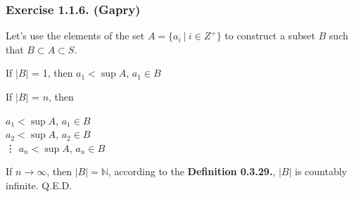 \subsubsection*{Exercise 1.1.6. (Gapry)}

\begin{flushleft}
Let's use the elements of the set $A = \{a_i\ |\ i \in Z^+\}$ to construct a subset $B$ such that $B \subset A \subset S$.
\vspace{10px}

If $|B|$ = 1, then $a_1 < \sup A$, $a_1 \in B$  
\vspace{10px}

If $|B|$ = $n$, then 

$a_1 < \sup A$, $a_1 \in B$ \\
$a_2 < \sup A$, $a_2 \in B$ \\ 
\vdots
$a_n < \sup A$, $a_n \in B$ \\ 

\vspace{10px}

If $n \to \infty$, then $|B| = \mathbb{N}$, 
according to the \textbf{Definition 0.3.29.}, 
$|B|$ is countably infinite. Q.E.D. 

\end{flushleft}